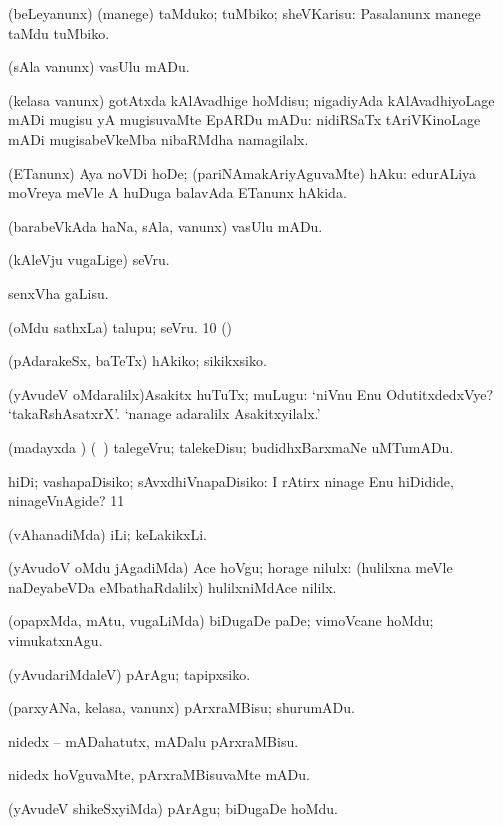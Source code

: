 {{ (beLeyanunx) (manege) taMduko; tuMbiko; sheVKarisu: 
Pasalanunx manege taMdu tuMbiko. 

 (sAla \mo vanunx) vasUlu mADu.

 (kelasa \mo vanunx) gotAtxda kAlAvadhige hoMdisu; nigadiyAda
kAlAvadhiyoLage mADi mugisu yA mugisuvaMte EpARDu mADu:  nidiRSaTx tAriVKinoLage mADi mugisabeVkeMba nibaRMdha namagilalx. 

 (ETanunx) Aya noVDi hoDe; (pariNAmakAriyAguvaMte) hAku:
 edurALiya moVreya meVle A huDuga balavAda ETanunx hAkida. 

 (barabeVkAda haNa, sAla, \mo vanunx) vasUlu mADu. 

 (kAleVju \mo vugaLige) seVru. 

 senxVha gaLisu. 

 (oMdu sathxLa) talupu; seVru. 
\num{10}  (\AmA)

 (pAdarakeSx, baTeTx) hAkiko; sikikxsiko. 

 (yAvudeV oMdaralilx)Asakitx huTuTx; muLugu:  `niVnu Enu OdutitxdedxVye? `takaRshAsatxrX'. `nanage adaralilx Asakitxyilalx.' 

 (madayxda \vi) (\sA\ ) talegeVru; talekeDisu; budidhxBarxmaNe uMTumADu. 

 hiDi; vashapaDisiko; sAvxdhiVnapaDisiko:  I rAtirx ninage Enu hiDidide, ninageVnAgide? 
\num{11}  

 (vAhanadiMda) iLi; keLakikxLi.

 (yAvudoV oMdu jAgadiMda) Ace hoVgu; horage nilulx:  (hulilxna meVle naDeyabeVDa eMbathaRdalilx) hulilxniMdAce nililx. 

 (opapxMda, mAtu, \mo vugaLiMda) biDugaDe paDe; vimoVcane hoMdu; vimukatxnAgu. 

 (yAvudariMdaleV) pArAgu; tapipxsiko. 

 (parxyANa, kelasa, \mo vanunx) pArxraMBisu; shurumADu. 

 nidedx -- mADahatutx, mADalu pArxraMBisu. 

 nidedx hoVguvaMte, pArxraMBisuvaMte mADu. 

 (yAvudeV shikeSxyiMda) pArAgu; biDugaDe hoMdu. 

}}
